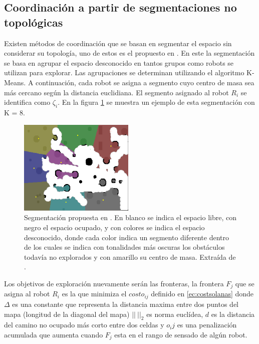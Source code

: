 \subsection{Coordinación a partir de segmentaciones no topológicas}\label{subsec:coordNoTop}
Existen métodos de coordinación que se basan en segmentar el espacio sin considerar su topología, uno de estos es el propuesto en \cite{Solanas2004}. En este la segmentación se basa en agrupar el espacio desconocido en tantos grupos como robots se utilizan para explorar. Las agrupaciones se determinan utilizando el algoritmo K-Means\cite{hartigan1979ak}. A continuación, cada robot se asigna a segmento cuyo centro de masa sea más cercano según la distancia euclidiana. El segmento asignado al robot $R_i$ se identifica como $\zeta_i$. En la figura \ref{fig:ejemploCoodGrill} se muestra un ejemplo de esta segmentación con K = 8. %
\begin{figure}[H]
  \center
  \includegraphics[width=5.5cm]{imagenes/coordGrillCM.png}
  \caption[Segmentación propuesta en \cite{Solanas2004}.]{Segmentación propuesta en \cite{Solanas2004}. En blanco se indica el espacio libre, con negro el espacio ocupado, y con colores se indica el espacio desconocido, donde cada color indica un segmento diferente dentro de los cuales se indica con tonalidades más oscuras los obstáculos todavía no explorados y con amarillo su centro de masa. Extraída de \cite{wu2007voronoi}.}\label{fig:ejemploCoodGrill}
\end{figure} 

Los objetivos de exploración nuevamente serán las fronteras, la frontera $F_j$ que se asigna al robot $R_i$ es la que minimiza el $costo_{ij}$ definido en \eqref{ec:costsolanas} donde $\Delta$ es una constante que representa la distancia maxima entre dos puntos del mapa (longitud de la diagonal del mapa) $||\ ||_2$ es norma euclídea, $d$ es la distancia del camino no ocupado más corto entre dos celdas y $o_ij$ es una penalización acumulada que aumenta cuando $F_j$ esta en el rango de sensado de algún robot.

